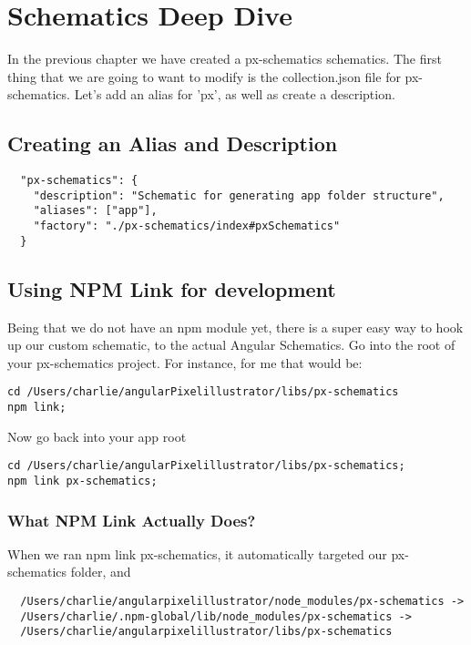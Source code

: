 \maketitle{}
\section{ Schematics Deep Dive }

In the previous chapter we have created a px-schematics schematics. The first
thing that we are going to want to modify is the collection.json file for
px-schematics. Let's add an alias for 'px', as well as create a description.

\subsection{ Creating an Alias and Description }
\begin{lstlisting}
  "px-schematics": {
    "description": "Schematic for generating app folder structure",
    "aliases": ["app"],
    "factory": "./px-schematics/index#pxSchematics"
  }
\end{lstlisting}

\subsection{ Using NPM Link for development }
Being that we do not have an npm module yet, there is a super easy way to hook
up our custom schematic, to the actual Angular Schematics. Go into the root
of your px-schematics project. For instance, for me that would be:
\begin{verbatim}
cd /Users/charlie/angularPixelillustrator/libs/px-schematics
npm link;
\end{verbatim}

Now go back into your app root
\begin{verbatim}
cd /Users/charlie/angularPixelillustrator/libs/px-schematics;
npm link px-schematics;
\end{verbatim}

\subsubsection{ What NPM Link Actually Does? }
When we ran npm link px-schematics, it automatically targeted our px-schematics
folder, and
\begin{lstlisting}
  /Users/charlie/angularpixelillustrator/node_modules/px-schematics ->
  /Users/charlie/.npm-global/lib/node_modules/px-schematics ->
  /Users/charlie/angularpixelillustrator/libs/px-schematics
\end{lstlisting}

